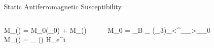 \documentclass{beamer} %
\begin{document}
\begin{frame}{}
\begin{columns}[t]
\begin{column}{.4\textwidth}
	\end{column}
	\begin{column}{.59\textwidth}
		\begin{block}{\centering\veryHuge Static Antiferromagnetic Susceptibility}
			\begin{columns}[t]
				\begin{column}{0.47\textwidth}
					\bea
					M_\alpha(\vR) = M_{0\alpha}(\vH_0) + \delta M_\alpha(\vR)
					\\
					\delta M_\alpha(\vR) = \chi_{\alpha\beta} (\vq) \delta H_\beta e^{i\vq \cdot \vR}
					\eea
				\end{column}
				\begin{column}{0.47\textwidth}
					\bea
					 M_0 = \mu_B \sum\limits_{\mu} (\sigma_3)_{\mu\mu}<\psi^\dagger_{\mu}\psi_{\mu}>_{_0}
					\eea
				\end{column}
			\end{columns}
			

\end{block}
\end{column}
\end{columns}
\end{frame}
\end{document}
